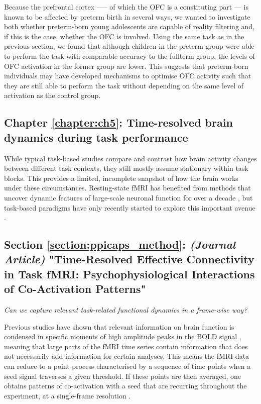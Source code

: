 Because the prefrontal cortex ––– of which the OFC is a constituting part ---  is known to be affected by preterm birth in several ways, we wanted to investigate both whether preterm-born young adolescents are capable of reality filtering and, if this is the case, whether the OFC is involved. Using the same task as in the previous section, we found that although children in the preterm group were able to perform the task with comparable accuracy to the fullterm group, the levels of OFC activation in the former group are lower. This suggests that preterm-born individuals may have developed mechanisms to optimise OFC activity such that they are still able to perform the task without depending on the same level of activation as the control group.


\subsection*{Chapter \ref{chapter:ch5}: Time-resolved brain dynamics during task performance}

While typical task-based studies compare and contrast how brain activity changes between different task contexts, they still mostly assume stationary within task blocks. This provides a limited, incomplete snapshot of how the brain works under these circumstances. Resting-state fMRI has benefited from methods that uncover dynamic features of large-scale neuronal function for over a decade \citep{Chang2010}, but task-based paradigms have only recently started to explore this important avenue \citep{Gonzalez-Castillo2018}.

\subsection*{Section \ref{section:ppicaps_method}: \textit{(Journal Article)} "Time-Resolved Effective Connectivity in Task fMRI: Psychophysiological Interactions of Co-Activation Patterns"}
\textit{Can we capture relevant task-related functional dynamics in a frame-wise way?}


Previous studies have shown that relevant information on brain function is condensed in specific moments of high amplitude peaks in the BOLD signal \citep{Tagliazucchi2011a}, meaning that large parts of the fMRI time series contain information that does not necessarily add information for certain analyses. This means the fMRI data can reduce to a point-process \citep{Tagliazucchi2012} characterised by a sequence of time points when a seed signal traverses a given threshold. If these points are then averaged, one obtains patterns of co-activation with a seed that are recurring throughout the experiment, at a single-frame resolution \citep{Liu2013}.

